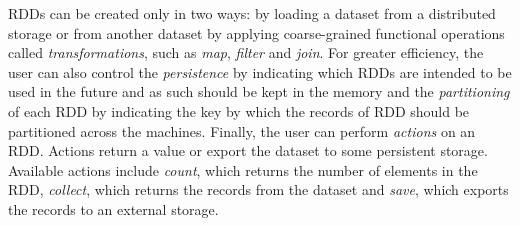 RDDs can be created only in two ways: by loading a dataset from a distributed storage or from another dataset by applying coarse-grained functional operations called \emph{transformations}, such as \emph{map}, \emph{filter} and \emph{join}. For greater efficiency, the user can also control the \emph{persistence} by indicating which RDDs are intended to be used in the future and as such should be kept in the memory and the \emph{partitioning} of each RDD by indicating the key by which the records of RDD should be partitioned across the machines. Finally, the user can perform \emph{actions} on an RDD. Actions return a value or export the dataset to some persistent storage. Available actions include \emph{count}, which returns the number of elements in the RDD, \emph{collect}, which returns the records from the dataset and \emph{save}, which exports the records to an external storage.

